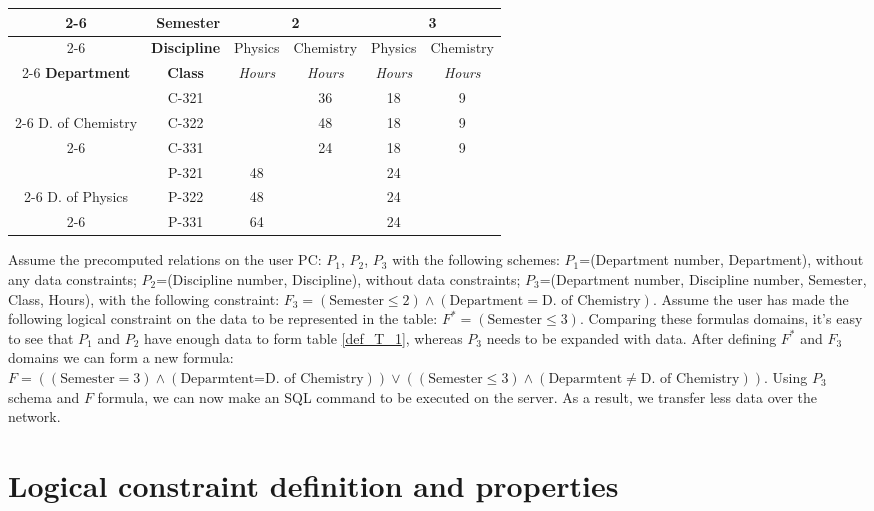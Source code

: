 \documentclass[10pt,journal,cspaper,compsoc]{IEEEtran}
\begin{document}
\begin{table*}[h!]
\renewcommand{\arraystretch}{1.3}
\caption{\label{def_T_1} Curriculum.}
\centering
\begin{tabular}{|c|c||c|c|c|c|}
\cline{2-6}
\multicolumn{1}{c|}{} & \multicolumn{1}{|r||}{\bf Semester} & \multicolumn{2}{|c|}{2} & \multicolumn{2}{|c|}{3}  \\
\cline{2-6}
\multicolumn{1}{c|}{} & {\bf Discipline} & Physics & Chemistry & Physics & Chemistry \\
\hline \cline{2-6}
{\bf Department} & {\bf Class} & {\it Hours} & {\it Hours} & {\it Hours} & {\it Hours} \\
\hline
 & C-321 & & 36 & 18 & 9 \\
\cline{2-6}
D. of Chemistry & C-322 & & 48 & 18 & 9 \\
\cline{2-6}
 & C-331 & & 24 & 18 & 9 \\
\hline
 & P-321 & 48 & & 24 & \\
\cline{2-6}
D. of Physics & P-322 & 48 & & 24 & \\
\cline{2-6}
 & P-331 & 64 & & 24 & \\
\hline
\end{tabular}
\end{table*}
Assume the precomputed relations on the user PC:  $P_1$,
$P_2$, $P_3$ with the following schemes: $P_1$=(Department number, Department),
without any data constraints; $P_2$=(Discipline number, Discipline), without
data constraints; $P_3$=(Department number, Discipline number, Semester, Class,
Hours), with the following constraint: $F_3 =(\mbox{Semester} \leq 2) \wedge
(\mbox{Department} = \mbox{D. of Chemistry})$. Assume the user has made the
following logical constraint on the data to be represented in the table:
$F^{\ast} = (\mbox{Semester} \leq 3)$. Comparing these formulas domains, it's
easy to see that $P_1$ and $P_2$ have enough data to form table \ref{def_T_1},
whereas $P_3$ needs to be expanded with data. After defining $F^{\ast}$ and
$F_3$ domains we can form a new formula: $F=((\mbox{Semester} = 3) \wedge
(\mbox{Deparmtent=D. of Chemistry})) \vee ((\mbox{Semester} \leq 3) \wedge
(\mbox{Deparmtent} \neq \mbox{D. of Chemistry}))$. Using $P_3$ schema and $F$
formula, we can now make an SQL command to be executed on the server. As a
result, we transfer less data over the network.


\section{Logical constraint definition and properties}
\end{document}
